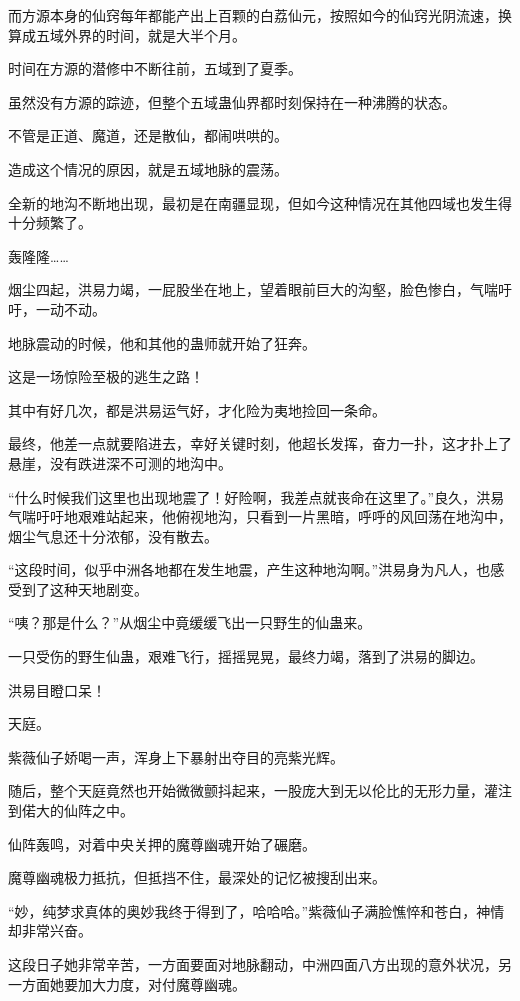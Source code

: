 \begin{this_body}
而方源本身的仙窍每年都能产出上百颗的白荔仙元，按照如今的仙窍光阴流速，换算成五域外界的时间，就是大半个月。

时间在方源的潜修中不断往前，五域到了夏季。

虽然没有方源的踪迹，但整个五域蛊仙界都时刻保持在一种沸腾的状态。

不管是正道、魔道，还是散仙，都闹哄哄的。

造成这个情况的原因，就是五域地脉的震荡。

全新的地沟不断地出现，最初是在南疆显现，但如今这种情况在其他四域也发生得十分频繁了。

轰隆隆……

烟尘四起，洪易力竭，一屁股坐在地上，望着眼前巨大的沟壑，脸色惨白，气喘吁吁，一动不动。

地脉震动的时候，他和其他的蛊师就开始了狂奔。

这是一场惊险至极的逃生之路！

其中有好几次，都是洪易运气好，才化险为夷地捡回一条命。

最终，他差一点就要陷进去，幸好关键时刻，他超长发挥，奋力一扑，这才扑上了悬崖，没有跌进深不可测的地沟中。

“什么时候我们这里也出现地震了！好险啊，我差点就丧命在这里了。”良久，洪易气喘吁吁地艰难站起来，他俯视地沟，只看到一片黑暗，呼呼的风回荡在地沟中，烟尘气息还十分浓郁，没有散去。

“这段时间，似乎中洲各地都在发生地震，产生这种地沟啊。”洪易身为凡人，也感受到了这种天地剧变。

“咦？那是什么？”从烟尘中竟缓缓飞出一只野生的仙蛊来。

一只受伤的野生仙蛊，艰难飞行，摇摇晃晃，最终力竭，落到了洪易的脚边。

洪易目瞪口呆！

天庭。

紫薇仙子娇喝一声，浑身上下暴射出夺目的亮紫光辉。

随后，整个天庭竟然也开始微微颤抖起来，一股庞大到无以伦比的无形力量，灌注到偌大的仙阵之中。

仙阵轰鸣，对着中央关押的魔尊幽魂开始了碾磨。

魔尊幽魂极力抵抗，但抵挡不住，最深处的记忆被搜刮出来。

“妙，纯梦求真体的奥妙我终于得到了，哈哈哈。”紫薇仙子满脸憔悴和苍白，神情却非常兴奋。

这段日子她非常辛苦，一方面要面对地脉翻动，中洲四面八方出现的意外状况，另一方面她要加大力度，对付魔尊幽魂。


\end{this_body}
